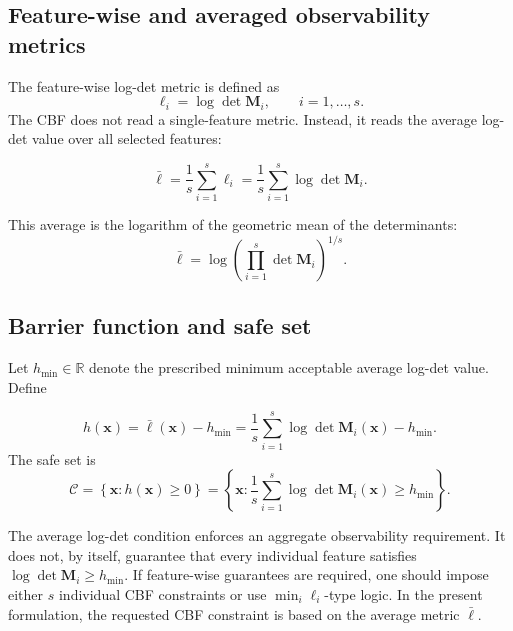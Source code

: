 \documentclass[11pt,a4paper]{article}
\newcommand{\R}{\mathbb{R}}
\begin{document}
\subsection{Feature-wise and averaged observability metrics}

The feature-wise log-det metric is defined as
\begin{equation}
  \ell_i = \log\det\bm{M}_{i},
  \qquad i=1,\ldots,s.
  \label{eq:ell_i_def}
\end{equation}
The CBF does not read a single-feature metric.  Instead, it reads the average
log-det value over all selected features:
\begin{resultbox}
\begin{equation}
  \boxed{
  \bar{\ell}
  = \frac{1}{s}\sum_{i=1}^{s}\ell_i
  = \frac{1}{s}\sum_{i=1}^{s}\log\det\bm{M}_{i}.}
  \label{eq:average_logdet}
\end{equation}
\end{resultbox}
This average is the logarithm of the geometric mean of the determinants:
\begin{equation}
  \bar{\ell}
  = \log\left(\prod_{i=1}^{s}\det\bm{M}_{i}\right)^{1/s}.
\end{equation}

\subsection{Barrier function and safe set}

Let $h_{\min}\in\R$ denote the prescribed minimum acceptable average log-det
value.  Define
\begin{definition}
\begin{equation}
  h(\bm{x})
  = \bar{\ell}(\bm{x}) - h_{\min}
  = \frac{1}{s}\sum_{i=1}^{s}\log\det\bm{M}_{i}(\bm{x}) - h_{\min}.
  \label{eq:h_average_def}
\end{equation}
The safe set is
\begin{equation}
  \mathcal{C}
  = \left\{\bm{x}: h(\bm{x})\ge0\right\}
  = \left\{\bm{x}: \frac{1}{s}\sum_{i=1}^{s}\log\det\bm{M}_{i}(\bm{x})
  \ge h_{\min}\right\}.
  \label{eq:safe_set_average}
\end{equation}
\end{definition}

\begin{remark}
The average log-det condition enforces an aggregate observability requirement.
It does not, by itself, guarantee that every individual feature satisfies
$\log\det\bm{M}_{i}\ge h_{\min}$.  If feature-wise guarantees are required,
one should impose either $s$ individual CBF constraints or use
$\min_i\ell_i$-type logic.  In the present formulation, the requested CBF
constraint is based on the average metric $\bar{\ell}$.
\end{remark}
\end{document}
